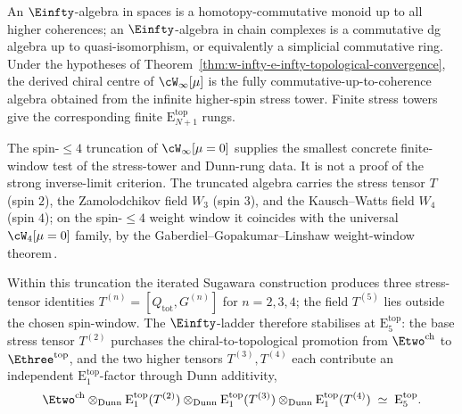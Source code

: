 \begin{remark}
\label{rem:winfty-commutative-all-coherences}
An $\Einfty$-algebra in spaces is a homotopy-commutative monoid up to
all higher coherences; an $\Einfty$-algebra in chain complexes is a
commutative dg algebra up to quasi-isomorphism, or equivalently a
simplicial commutative ring. Under the hypotheses of
Theorem~\ref{thm:w-infty-e-infty-topological-convergence}, the derived
chiral centre of $\cW_\infty[\mu]$ is the fully
commutative-up-to-coherence algebra obtained from the infinite
higher-spin stress tower. Finite stress towers give the corresponding
finite $\mathrm{E}_{N+1}^{\mathrm{top}}$ rungs.
\end{remark}

\begin{example}
\label{ex:w-infty-spin4-truncation}
The spin-$\le 4$ truncation of $\cW_\infty[\mu=0]$ supplies the smallest
concrete finite-window test of the stress-tower and Dunn-rung data.
It is not a proof of the strong inverse-limit criterion.
The truncated algebra carries the stress tensor $T$ (spin $2$), the
Zamolodchikov field $W_3$ (spin $3$), and the Kausch--Watts field $W_4$
(spin $4$); on the spin-$\le 4$ weight window it coincides with the
universal $\cW_4[\mu=0]$ family, by the Gaberdiel--Gopakumar--Linshaw
weight-window theorem\,\cite{GG12-Winfty,ProchazkaRapcak18,
Linshaw-Winfty-universal}.

Within this truncation the iterated Sugawara construction produces
three stress-tensor identities $T^{(n)} = [Q_{\mathrm{tot}}, G^{(n)}]$
for $n = 2, 3, 4$; the field $T^{(5)}$ lies outside the chosen
spin-window. The
$\Einfty$-ladder therefore stabilises at $\mathrm{E}_5^{\mathrm{top}}$:
the base stress tensor $T^{(2)}$ purchases the chiral-to-topological
promotion from $\Etwo^{\mathrm{ch}}$ to $\Ethree^{\mathrm{top}}$, and
the two higher tensors $T^{(3)}, T^{(4)}$ each contribute an independent
$\mathrm{E}_1^{\mathrm{top}}$-factor through Dunn additivity,
\[
\Etwo^{\mathrm{ch}}
\otimes_{\mathrm{Dunn}} \mathrm{E}_1^{\mathrm{top}}(T^{(2)})
\otimes_{\mathrm{Dunn}} \mathrm{E}_1^{\mathrm{top}}(T^{(3)})
\otimes_{\mathrm{Dunn}} \mathrm{E}_1^{\mathrm{top}}(T^{(4)})
\;\simeq\; \mathrm{E}_5^{\mathrm{top}}.
\]


\end{example}
